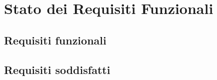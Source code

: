 
\section{Stato dei Requisiti Funzionali}
\label{sec:stato_requisiti_funzionali}


\subsection{Requisiti funzionali}
\label{sec:requisiti_funzionali}

\subsection{Requisiti soddisfatti}
\label{sec:requisiti_soddisfatti}
